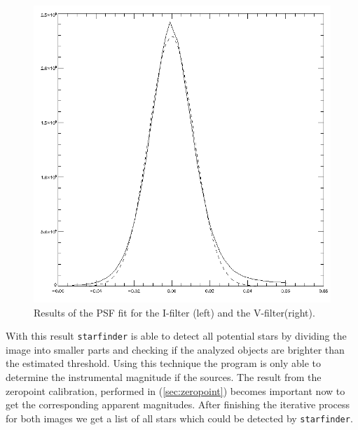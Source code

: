 \begin{figure}[H]
\begin{minipage}{0.2 \textwidth}
\end{minipage}
\begin{minipage}{0.2\textwidth}
\vspace{3pt}
\hspace{15pt}
		\includegraphics[scale=0.148]{figures/Exposures/psf_noise_V.png}
\end{minipage}
\caption{Results of the PSF fit for the I-filter (left) and the V-filter(right).} 
\end{figure} 

With this result \texttt{starfinder} is able to detect all potential stars by dividing the image into smaller parts and checking if the analyzed objects are brighter than the estimated threshold. 
Using this technique the program is only able to determine the instrumental magnitude if the sources. The result from the zeropoint calibration, performed in (\ref{sec:zeropoint}) becomes important now to get the corresponding apparent magnitudes.
After finishing the iterative process for both images we get a list of all stars which could be detected by \texttt{starfinder}. 

